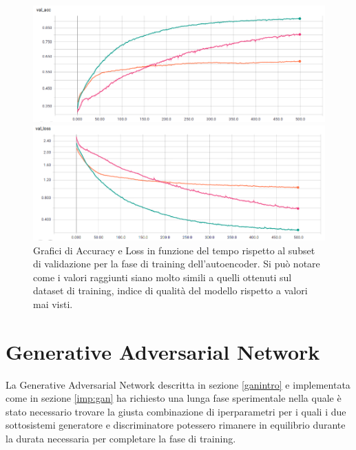\begin{figure}[p]
    \centering
    \begin{minipage}[t]{0.7\linewidth}
    	\includegraphics[width=\linewidth]{figures/autoenc3.png}
    \end{minipage}\hfill
    \begin{minipage}[b]{0.7\linewidth}
    	\includegraphics[width=\linewidth]{figures/autoenc4.png}
    \end{minipage}
    
\caption{Grafici di Accuracy e Loss in funzione del tempo rispetto al subset di validazione per la fase di training dell'autoencoder. Si può notare come i valori raggiunti siano molto simili a quelli ottenuti sul dataset di training, indice di qualità del modello rispetto a valori mai visti. \label{fig:aut2} }
\end{figure}

\newpage
\section{Generative Adversarial Network}
\label{ris:gan}
La Generative Adversarial Network descritta in sezione \ref{ganintro} e implementata come in sezione \ref{imp:gan} ha richiesto una lunga fase sperimentale nella quale è stato necessario trovare la giusta combinazione di iperparametri per i quali i due sottosistemi generatore e discriminatore potessero rimanere in equilibrio durante la durata necessaria per completare la fase di training. 

